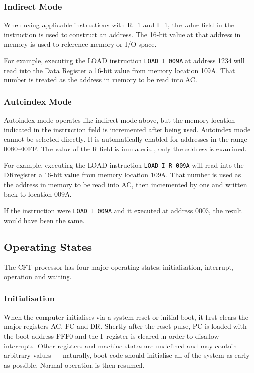 \documentclass[11pt,a4paper,twocolumns]{article}
\newcommand\hex[1]{\textsf{#1}}
\newcommand\register[1]{\textsf{#1}}
\newcommand\A{\register{AC}}
\newcommand\Ireg{\register{I}}
\newcommand\DR{\register{DR}}
\newcommand\PC{\register{PC}}
\begin{document}
\subsubsection{Indirect Mode}

When using applicable instructions with R=1 and I=1, the value field
in the instruction is used to construct an address. The 16-bit value
at that address in memory is used to reference memory or I/O space.

For example, executing the LOAD instruction {\tt LOAD I 009A} at
address \hex{1234} will read into the Data Register a 16-bit value
from memory location \hex{109A}. That number is treated as the address
in memory to be read into \A.

\subsubsection{Autoindex Mode}

Autoindex mode operates like indirect mode above, but the memory
location indicated in the instruction field is incremented after being
used. Autoindex mode cannot be selected directly. It is automatically
enabled for addresses in the range \hex{0080}–\hex{00FF}. The value of the R
field is immaterial, only the address is examined.

For example, executing the LOAD instruction {\tt LOAD I R 009A} will
read into the \DR register a 16-bit value from memory location
\hex{109A}. That number is used as the address in memory to be read
into \A, then incremented by one and written back to location
\hex{009A}.

If the instruction were {\tt LOAD I 009A} and it executed at address
\hex{0003}, the result would have been the same.

\subsection{Operating States}

The CFT processor has four major operating states: initialisation, interrupt,
operation and waiting.

\subsubsection{Initialisation}

When the computer initialises via a system reset or initial boot, it
first clears the major registers \A, \PC{} and \DR{}. Shortly after
the reset pulse, \PC{} is loaded with the boot address \hex{FFF0} and
the \Ireg\ register is cleared in order to disallow interrupts.  Other
registers and machine states are undefined and may contain arbitrary
values — naturally, boot code should initialise all of the system as
early as possible. Normal operation is then resumed.
\end{document}
